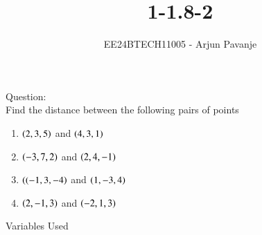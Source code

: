 \documentclass[journal]{IEEEtran}
\begin{document}

\vspace{3cm}

\title{1-1.8-2}
\author{EE24BTECH11005 - Arjun Pavanje
}
{\let\newpage\relax\maketitle}
Question:\\
Find the distance between the following pairs of points\\
\begin{enumerate}
	\item $\left(2,3,5\right)$ and $\left(4,3,1\right)$
	\item $\left(-3,7,2\right)$ and $\left(2,4,-1\right)$
	\item $\left((-1,3,-4\right)$ and $\left(1,-3,4\right)$
	\item $\left(2,-1,3\right)$ and $\left(-2,1,3\right)$
\end{enumerate}
\solution
\begin{table}[h!]    
  \centering
  
  \caption{Variables Used}
  \label{tab1-1.5-29}
\end{table}\\
\end{document}
